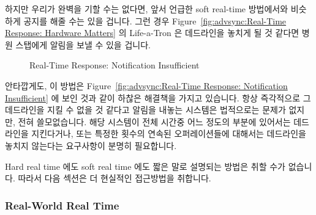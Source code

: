 하지만 우리가 완벽을 기할 수는 없다면, 앞서 언급한 soft real-time 방법에서와
비슷하게 공지를 해줄 수는 있을 겁니다.
그런 경우
Figure~\ref{fig:advsync:Real-Time Response: Hardware Matters} 의 Life-a-Tron 은
데드라인을 놓치게 될 것 같다면 병원 스탭에게 알림을 보낼 수 있을 겁니다.

\begin{figure}[bt]
\centering
{}
\caption{Real-Time Response: Notification Insufficient}
\end{figure}

안타깝게도, 이 방법은
Figure~\ref{fig:advsync:Real-Time Response: Notification Insufficient} 에 보인 것과
같이 하찮은 해결책을 가지고 있습니다.
항상 즉각적으로 그 데드라인을 지킬 수 없을 것 같다고 알림을 내놓는 시스템은
법적으로는 문제가 없지만, 전혀 쓸모없습니다.
해당 시스템이 전체 시간중 어느 정도의 부분에 있어서는 데드라인을 지킨다거나,
또는 특정한 횟수의 연속된 오퍼레이션들에 대해서는 데드라인을 놓치지 않는다는
요구사항이 분명히 필요합니다.

Hard real time 에도 soft real time 에도 짧은 말로 설명되는 방법은 취할 수가
없습니다.
따라서 다음 섹션은 더 현실적인 접근방법을 취합니다.

\subsubsection{Real-World Real Time}
\label{sec:advsync:Real-World Real Time}

